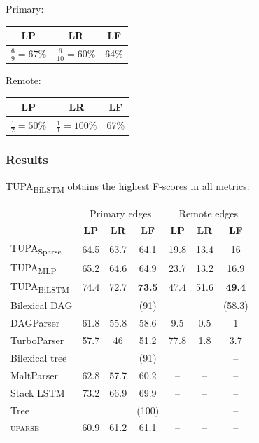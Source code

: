 \documentclass[t,xcolor={svgnames}]{beamer}
\newcommand{\parser}[1]{TUPA\textsubscript{#1}}
\begin{document}
\begin{frame}
\begin{adjustbox}{frame,scale=.75,center}
\end{adjustbox}
\vfill
\begin{adjustbox}{scale=.75,center}
	Primary:
    \begin{tabular}{ccc}
        \textbf{LP} & \textbf{LR} & \textbf{LF} \\ \hline
        $\frac69=67\%$ & $\frac6{10}=60\%$ & 64\%
    \end{tabular}
    \hspace{1cm}
	Remote:
    \begin{tabular}{ccc}
        \textbf{LP} & \textbf{LR} & \textbf{LF} \\ \hline
        $\frac12=50\%$ & $\frac11=100\%$ & 67\%
    \end{tabular}
\end{adjustbox}
\end{frame}


\begin{frame}
\frametitle{Results}
\parser{BiLSTM} obtains the highest F-scores in all metrics:
\begin{center}
    \begin{tabular}{l|ccc|ccc}
        & \multicolumn{3}{c|}{Primary edges} & \multicolumn{3}{c}{Remote edges} \\
        & \textbf{LP} & \textbf{LR} & \textbf{LF} & \textbf{LP} & \textbf{LR} & \textbf{LF} \\
        \hline
        \parser{Sparse}
        & 64.5 & 63.7 & 64.1 & 19.8 & 13.4 & 16 \\
        \parser{MLP}
        & 65.2 & 64.6 & 64.9 & 23.7 & 13.2 & 16.9 \\
        \parser{BiLSTM}
        & 74.4 & 72.7 & \textbf{73.5} & 47.4 & 51.6 & \textbf{49.4} \\
        \hline
        \scriptsize Bilexical DAG
        & & & \scriptsize (91) & & & \scriptsize (58.3) \\
    	DAGParser
        & 61.8 & 55.8 & 58.6 & 9.5 & 0.5 & 1 \\
    	TurboParser
        & 57.7 & 46 & 51.2 & 77.8 & 1.8 & 3.7 \\
        \hline
        \scriptsize Bilexical tree
        & & & \scriptsize (91) & & & \scriptsize -- \\
    	MaltParser
        & 62.8 & 57.7 & 60.2 & -- & -- & -- \\
    	Stack LSTM
        & 73.2 & 66.9 & 69.9 & -- & -- & -- \\
        \hline
        \scriptsize Tree
        & & & \scriptsize (100) & & & \scriptsize -- \\
        \textsc{uparse}
        & 60.9 & 61.2 & 61.1 & -- & -- & --
    \end{tabular}
\end{center}
\end{frame}
\end{document}
